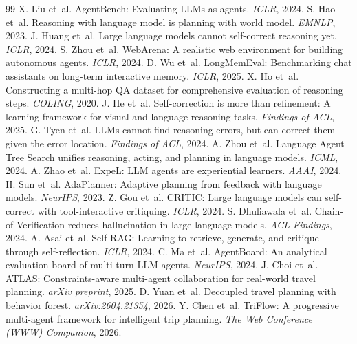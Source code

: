 \documentclass{article}
\begin{document}
\begin{thebibliography}{99}
 X. Liu et~al. AgentBench: Evaluating LLMs as agents. \emph{ICLR}, 2024.
 S. Hao et~al. Reasoning with language model is planning with world model. \emph{EMNLP}, 2023.
 J. Huang et~al. Large language models cannot self-correct reasoning yet. \emph{ICLR}, 2024.
 S. Zhou et~al. WebArena: A realistic web environment for building autonomous agents. \emph{ICLR}, 2024.
 D. Wu et~al. LongMemEval: Benchmarking chat assistants on long-term interactive memory. \emph{ICLR}, 2025.
 X. Ho et~al. Constructing a multi-hop QA dataset for comprehensive evaluation of reasoning steps. \emph{COLING}, 2020.
 J. He et~al. Self-correction is more than refinement: A learning framework for visual and language reasoning tasks. \emph{Findings of ACL}, 2025.
 G. Tyen et~al. LLMs cannot find reasoning errors, but can correct them given the error location. \emph{Findings of ACL}, 2024.
 A. Zhou et~al. Language Agent Tree Search unifies reasoning, acting, and planning in language models. \emph{ICML}, 2024.
 A. Zhao et~al. ExpeL: LLM agents are experiential learners. \emph{AAAI}, 2024.
 H. Sun et~al. AdaPlanner: Adaptive planning from feedback with language models. \emph{NeurIPS}, 2023.
 Z. Gou et~al. CRITIC: Large language models can self-correct with tool-interactive critiquing. \emph{ICLR}, 2024.
 S. Dhuliawala et~al. Chain-of-Verification reduces hallucination in large language models. \emph{ACL Findings}, 2024.
 A. Asai et~al. Self-RAG: Learning to retrieve, generate, and critique through self-reflection. \emph{ICLR}, 2024.
 C. Ma et~al. AgentBoard: An analytical evaluation board of multi-turn LLM agents. \emph{NeurIPS}, 2024.
 J. Choi et~al. ATLAS: Constraints-aware multi-agent collaboration for real-world travel planning. \emph{arXiv preprint}, 2025.
 D. Yuan et~al. Decoupled travel planning with behavior forest. \emph{arXiv:2604.21354}, 2026.
 Y. Chen et~al. TriFlow: A progressive multi-agent framework for intelligent trip planning. \emph{The Web Conference (WWW) Companion}, 2026.


\end{thebibliography}
\end{document}
